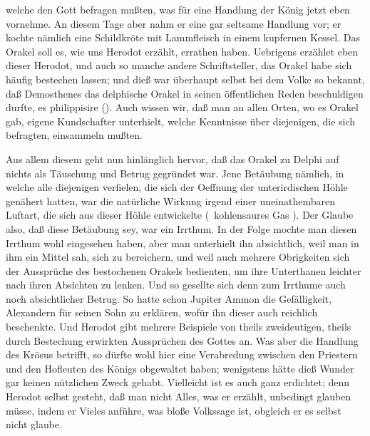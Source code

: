 \begin{aufza}
welche den Gott befragen mußten, was für eine Handlung der König jetzt eben vornehme. An diesem Tage aber nahm er eine gar seltsame Handlung vor; er kochte nämlich eine Schildkröte mit Lammfleisch in einem kupfernen Kessel. Das Orakel soll es, wie uns Herodot erzählt, errathen haben. Uebrigens erzählet eben dieser Herodot, und auch so manche andere Schriftsteller, das Orakel habe sich häufig bestechen lassen; und dieß war überhaupt selbst bei dem Volke so bekannt, daß Demosthenes das delphische Orakel in seinen öffentlichen Reden beschuldigen durfte, es philippisire (). Auch wissen wir, daß man an allen Orten, wo es Orakel gab, eigene Kundschafter unterhielt, welche Kenntnisse über diejenigen, die sich befragten, einsammeln mußten.
\item Aus allem diesem geht nun hinlänglich hervor, daß das Orakel zu Delphi auf nichts als Täuschung und Betrug gegründet war. Jene Betäubung nämlich, in welche alle diejenigen verfielen, die sich der Oeffnung der unterirdischen Höhle genähert hatten, war die natürliche Wirkung irgend einer uneinathembaren Luftart, die sich aus dieser Höhle entwickelte (\zB\ kohlensaures Gas \udgl ). Der Glaube also, daß diese Betäubung  sey, war ein Irrthum. In der Folge mochte man diesen Irrthum wohl eingesehen haben, aber man unterhielt ihn absichtlich, weil man in ihm ein Mittel sah, sich zu bereichern, und weil auch mehrere Obrigkeiten sich der Aussprüche des bestochenen Orakels bedienten, um ihre Unterthanen leichter nach ihren Absichten zu lenken. Und so gesellte sich denn zum Irrthume auch noch absichtlicher Betrug. So hatte schon Jupiter Ammon die Gefälligkeit, Alexandern für seinen Sohn zu erklären, wofür ihn dieser auch reichlich beschenkte. Und Herodot gibt mehrere Beispiele von theils zweideutigen, theils durch Bestechung erwirkten Aussprüchen des Gottes an. Was aber die Handlung des Krösus betrifft, so dürfte wohl hier eine Verabredung zwischen den Priestern und den Hofleuten des Königs obgewaltet haben; wenigstens hätte dieß Wunder gar keinen nützlichen Zweck gehabt. Vielleicht ist es auch ganz erdichtet; denn Herodot selbst gesteht, daß man nicht Alles, was er erzählt, unbedingt glauben müsse, indem er Vieles anführe, was bloße Volkssage ist, obgleich er es selbst nicht glaube.~
\end{aufza}

